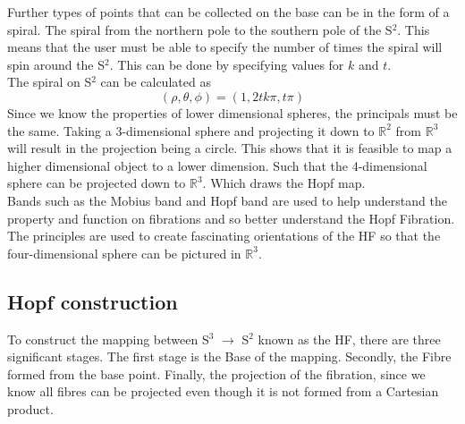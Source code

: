 \documentclass[12pt]{article} %
\begin{document}
\begin{flushleft}
Further types of points that can be collected on the base can be in the form of a spiral. The spiral from the northern pole to the southern pole of the S$^{2}$. This means that the user must be able to specify the number of times the spiral will spin around the S$^{2}$. This can be done by specifying values for $k$ and $t$.\\
The spiral on S$^{2}$ can be calculated as
\begin{equation}
(\rho, \theta, \phi) = (1, 2tk\pi, t \pi)
\end{equation}
Since we know the properties of lower dimensional spheres, the principals must be the same. Taking a 3-dimensional sphere and projecting it down to $\mathbb{R}^{2}$ from $\mathbb{R}^{3}$ will result in the projection being a circle. This shows that it is feasible to map a higher dimensional object to a lower dimension. Such that the 4-dimensional sphere can be projected down to $\mathbb{R}^{3}$. Which draws the Hopf map.\\
Bands such as the Mobius band and Hopf band are used to help understand the property and function on fibrations and so better understand the Hopf Fibration. The principles are used to create fascinating orientations of the HF so that the four-dimensional sphere can be pictured in $\mathbb{R}^{3}$.\\


\subsection{Hopf construction} %
To construct the mapping between S$^{3}$ $\rightarrow$ S$^{2}$ known as the HF, there are three significant stages. The first stage is the Base of the mapping. Secondly, the Fibre formed from the base point. Finally, the projection of the fibration, since we know all fibres can be projected even though it is not formed from a Cartesian product.


\end{flushleft}
\end{document}
